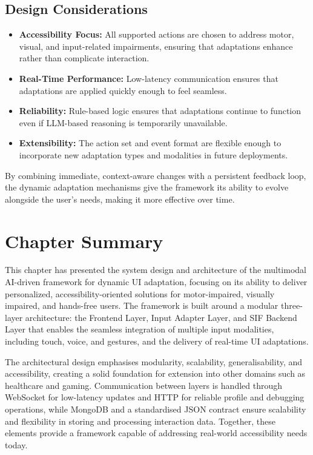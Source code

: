 \subsection{Design Considerations}
\begin{itemize}
    \item \textbf{Accessibility Focus:} All supported actions are chosen to address motor, visual, and input-related impairments, ensuring that adaptations enhance rather than complicate interaction.
    \item \textbf{Real-Time Performance:} Low-latency communication ensures that adaptations are applied quickly enough to feel seamless.
    \item \textbf{Reliability:} Rule-based logic ensures that adaptations continue to function even if LLM-based reasoning is temporarily unavailable.
    \item \textbf{Extensibility:} The action set and event format are flexible enough to incorporate new adaptation types and modalities in future deployments.
\end{itemize}
By combining immediate, context-aware changes with a persistent feedback loop, the dynamic adaptation mechanisms give the framework its ability to evolve alongside the user’s needs, making it more effective over time.

\section{Chapter Summary}
This chapter has presented the system design and architecture of the multimodal AI-driven framework for dynamic UI adaptation, focusing on its ability to deliver personalized, accessibility-oriented solutions for motor-impaired, visually impaired, and hands-free users. The framework is built around a modular three-layer architecture: the Frontend Layer, Input Adapter Layer, and SIF Backend Layer that enables the seamless integration of multiple input modalities, including touch, voice, and gestures, and the delivery of real-time UI adaptations.

The architectural design emphasises modularity, scalability, generalisability, and accessibility, creating a solid foundation for extension into other domains such as healthcare and gaming. Communication between layers is handled through WebSocket for low-latency updates and HTTP for reliable profile and debugging operations, while MongoDB and a standardised JSON contract ensure scalability and flexibility in storing and processing interaction data.
Together, these elements provide a framework capable of addressing real-world accessibility needs today.